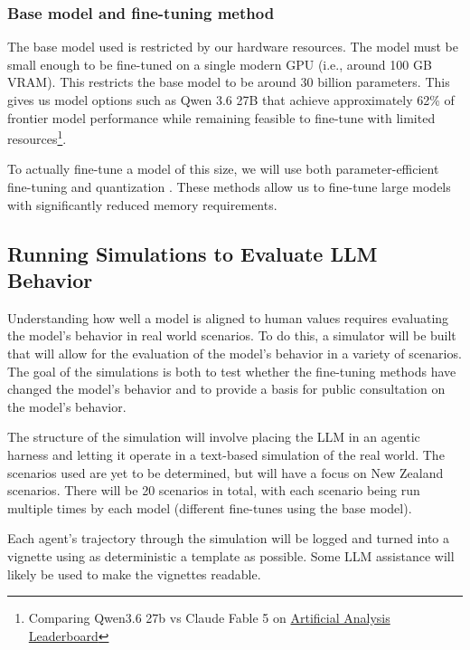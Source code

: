 \documentclass[11pt, a4paper]{article}
\begin{document}
\subsubsection{Base model and fine-tuning method}

The base model used is restricted by our hardware resources. The model must be small enough to be fine-tuned on a single modern GPU (i.e., around 100 GB VRAM). This restricts the base model to be around 30 billion parameters. This gives us model options such as Qwen 3.6 27B that achieve approximately 62\% of frontier model performance while remaining feasible to fine-tune with limited resources\footnote{Comparing Qwen3.6 27b vs Claude Fable 5 on \href{https://artificialanalysis.ai/leaderboards/models}{Artificial Analysis Leaderboard}}.

To actually fine-tune a model of this size, we will use both parameter-efficient fine-tuning \cite{huLoRALowRankAdaptation2021,dettmersQLoRAEfficientFinetuning2023} and quantization \cite{xiaoSmoothQuantAccurateEfficient2024}. These methods allow us to fine-tune large models with significantly reduced memory requirements.

\subsection{Running Simulations to Evaluate LLM Behavior}

Understanding how well a model is aligned to human values requires evaluating the model's behavior in real world scenarios. To do this, a simulator will be built that will allow for the evaluation of the model's behavior in a variety of scenarios. The goal of the simulations is both to test whether the fine-tuning methods have changed the model's behavior and to provide a basis for public consultation on the model's behavior.

The structure of the simulation will involve placing the LLM in an agentic harness and letting it operate in a text-based simulation of the real world. The scenarios used are yet to be determined, but will have a focus on  New Zealand scenarios. There will be 20 scenarios in total, with each scenario being run multiple times by each model (different fine-tunes using the base model).

Each agent's trajectory through the simulation will be logged and turned into a vignette using as deterministic a template as possible. Some LLM assistance will likely be used to make the vignettes readable.
\end{document}
